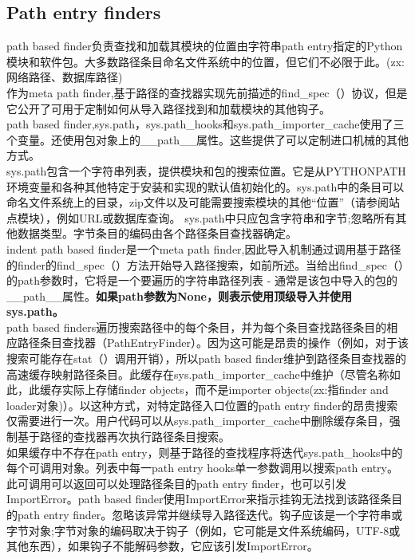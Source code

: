 \documentclass[10pt,UTF8]{ctexart}
\begin{document}
\subsection{Path entry finders}
path based finder负责查找和加载其模块的位置由字符串path entry指定的Python模块和软件包。大多数路径条目命名文件系统中的位置，但它们不必限于此。(zx:网络路径、数据库路径)\\
\indent 作为meta path finder,基于路径的查找器实现先前描述的find_spec（）协议，但是它公开了可用于定制如何从导入路径找到和加载模块的其他钩子。\\
\indent path based finder,sys.path，sys.path_hooks和sys.path_importer_cache使用了三个变量。还使用包对象上的__path__属性。这些提供了可以定制进口机械的其他方式。\\
\indent sys.path包含一个字符串列表，提供模块和包的搜索位置。它是从PYTHONPATH环境变量和各种其他特定于安装和实现的默认值初始化的。sys.path中的条目可以命名文件系统上的目录，zip文件以及可能需要搜索模块的其他“位置”（请参阅​​站点模块），例如URL或数据库查询。 sys.path中只应包含字符串和字节;忽略所有其他数据类型。字节条目的编码由各个路径条目查找器确定。
\\indent path based finder是一个meta path finder,因此导入机制通过调用基于路径的finder的find_spec（）方法开始导入路径搜索，如前所述。当给出find_spec（）的path参数时，它将是一个要遍历的字符串路径列表 - 通常是该包中导入的包的__path__属性。\textbf{如果path参数为None，则表示使用顶级导入并使用sys.path。}\\
\indent path based finders遍历搜索路径中的每个条目，并为每个条目查找路径条目的相应路径条目查找器（PathEntryFinder）。因为这可能是昂贵的操作（例如，对于该搜索可能存在stat（）调用开销），所以path based finder维护到路径条目查找器的高速缓存映射路径条目。此缓存在sys.path_importer_cache中维护（尽管名称如此，此缓存实际上存储finder objects，而不是importer objects(zx:指finder and loader对象)）。以这种方式，对特定路径入口位置的path entry finder的昂贵搜索仅需要进行一次。用户代码可以从sys.path_importer_cache中删除缓存条目，强制基于路径的查找器再次执行路径条目搜索。\\
\indent 如果缓存中不存在path entry，则基于路径的查找程序将迭代sys.path_hooks中的每个可调用对象。列表中每一path entry hooks单一参数调用以搜索path entry。此可调用可以返回可以处理路径条目的path entry finder，也可以引发ImportError。path based finder使用ImportError来指示挂钩无法找到该路径条目的path entry finder。忽略该异常并继续导入路径迭代。钩子应该是一个字符串或字节对象;字节对象的编码取决于钩子（例如，它可能是文件系统编码，UTF-8或其他东西），如果钩子不能解码参数，它应该引发ImportError。\\
\end{document}
